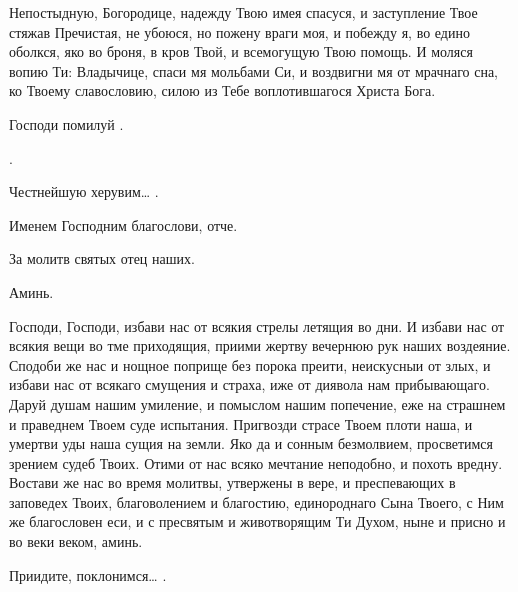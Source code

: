 \begin{mymulticols}
 Непостыдную, Богородице, надежду Твою имея спасуся, и заступление Твое стяжав Пречистая, не убоюся, но пожену враги моя, и побежду я, во едино оболкся, яко во броня, в кров Твой, и всемогущую Твою помощь. И моляся вопию Ти: Владычице, спаси мя мольбами Си, и воздвигни мя от мрачнаго сна, ко Твоему славословию, силою из Тебе воплотившагося Христа Бога.

Господи помилуй . 

.

Честнейшую херувим… .

Именем Господним благослови, отче.

За молитв святых отец наших. 

Аминь.



Господи, Господи, избави нас от всякия стрелы летящия во дни. И избави нас от всякия вещи во тме приходящия, приими жертву вечернюю рук наших воздеяние. Сподоби же нас и нощное поприще без порока преити, неискусныи от злых, и избави нас от всякаго смущения и страха, иже от диявола нам прибывающаго. Даруй душам нашим умиление, и помыслом нашим попечение, еже на страшнем и праведнем Твоем суде испытания. Пригвозди страсе Твоем плоти наша, и умертви уды наша сущия на земли. Яко да и сонным безмолвием, просветимся зрением судеб Твоих. Отими от нас всяко мечтание неподобно, и похоть вредну. Востави же нас во время молитвы, утвержены в вере, и преспевающих в заповедех Твоих, благоволением и благостию, единороднаго Сына Твоего, с Ним же благословен еси, и с пресвятым и животворящим Ти Духом, ныне и присно и во веки веком, аминь.

Приидите, поклонимся… .





\end{mymulticols}
